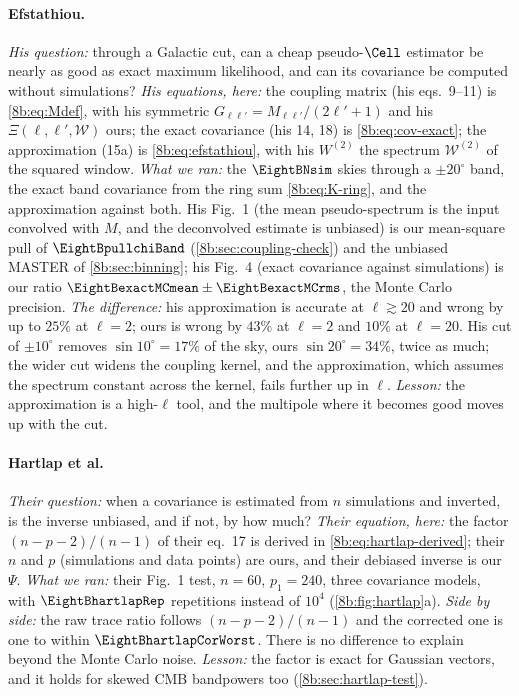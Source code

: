 \paragraph{Efstathiou.}
\emph{His question:} through a Galactic cut, can a cheap pseudo-$\Cell$ estimator be nearly as good as exact
maximum likelihood, and can its covariance be computed without simulations? \emph{His equations, here:}
the coupling matrix (his eqs.~9--11) is \eqref{8b:eq:Mdef}, with his symmetric $G_{\ell\ell'}=M_{\ell\ell'}/(2\ell'+1)$ and
his $\Xi(\ell,\ell',\mathcal W)$ ours; the exact covariance (his 14, 18) is \eqref{8b:eq:cov-exact}; the approximation
(15a) is \eqref{8b:eq:efstathiou}, with his $W^{(2)}$ the spectrum $\mathcal W^{(2)}$ of the squared window. \emph{What we
ran:} the $\EightBNsim$ skies through a $\pm20^\circ$ band, the exact band covariance from the ring sum
\eqref{8b:eq:K-ring}, and the approximation against both. His Fig.~1 (the mean pseudo-spectrum is the
input convolved with $M$, and the deconvolved estimate is unbiased) is our mean-square pull of
$\EightBpullchiBand$ (\cref{8b:sec:coupling-check}) and the unbiased MASTER of \cref{8b:sec:binning}; his Fig.~4
(exact covariance against simulations) is our ratio $\EightBexactMCmean\pm\EightBexactMCrms$, the Monte Carlo precision.
\emph{The difference:} his approximation is accurate at $\ell\gtrsim20$ and wrong by up to $25\%$ at $\ell=2$; ours is wrong
by $43\%$ at $\ell=2$ and $10\%$ at $\ell=20$. His cut of $\pm10^\circ$ removes $\sin10^\circ=17\%$ of the sky, ours $\sin20^\circ=34\%$,
twice as much; the wider cut widens the coupling kernel, and the approximation, which assumes the
spectrum constant across the kernel, fails further up in $\ell$. \emph{Lesson:} the approximation is a
high-$\ell$ tool, and the multipole where it becomes good moves up with the cut.

\paragraph{Hartlap et al.}
\emph{Their question:} when a covariance is estimated from $n$ simulations and inverted, is the inverse
unbiased, and if not, by how much? \emph{Their equation, here:} the factor $(n-p-2)/(n-1)$ of their eq.~17 is
derived in \eqref{8b:eq:hartlap-derived}; their $n$ and $p$ (simulations and data points) are ours, and their
debiased inverse is our $\Psi$. \emph{What we ran:} their Fig.~1 test, $n=60$, $p_1=240$, three covariance models,
with $\EightBhartlapRep$ repetitions instead of $10^4$ (\cref{8b:fig:hartlap}a). \emph{Side by side:} the raw
trace ratio follows $(n-p-2)/(n-1)$ and the corrected one is one to within $\EightBhartlapCorWorst$. There is no
difference to explain beyond the Monte Carlo noise. \emph{Lesson:} the factor is exact for Gaussian
vectors, and it holds for skewed CMB bandpowers too (\cref{8b:sec:hartlap-test}).

